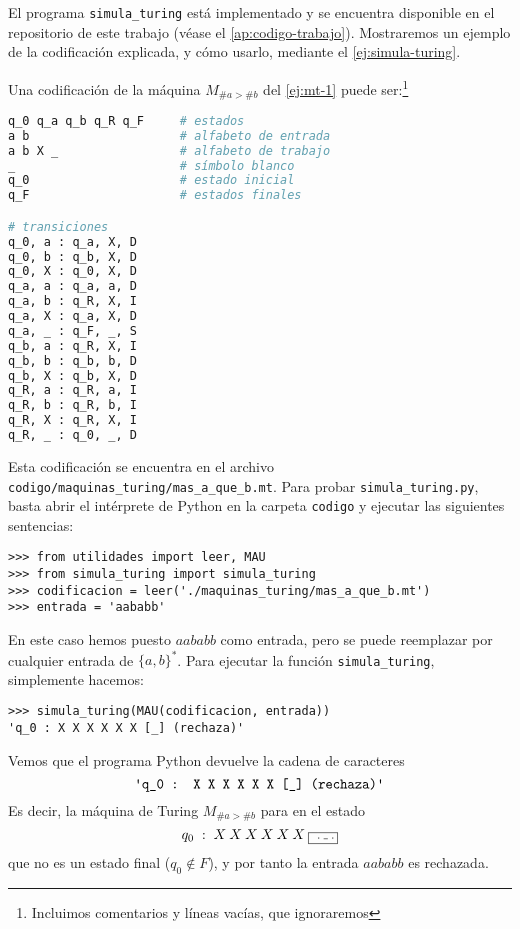 El programa \texttt{simula\_turing} está implementado y se encuentra disponible en el repositorio de este trabajo (véase el \cref{ap:codigo-trabajo}). Mostraremos un ejemplo de la codificación explicada, y cómo usarlo, mediante el \cref{ej:simula-turing}.

\begin{ejemplo}\label{ej:simula-turing}
Una codificación de la máquina $M_{\#a>\#b}$ del \cref{ej:mt-1} puede ser:\footnote{Incluimos comentarios y líneas vacías, que ignoraremos}

\begin{lstlisting}[language=Python]
q_0 q_a q_b q_R q_F     # estados
a b                     # alfabeto de entrada
a b X _                 # alfabeto de trabajo
_                       # símbolo blanco
q_0                     # estado inicial
q_F                     # estados finales

# transiciones
q_0, a : q_a, X, D
q_0, b : q_b, X, D
q_0, X : q_0, X, D
q_a, a : q_a, a, D
q_a, b : q_R, X, I
q_a, X : q_a, X, D
q_a, _ : q_F, _, S
q_b, a : q_R, X, I
q_b, b : q_b, b, D
q_b, X : q_b, X, D
q_R, a : q_R, a, I
q_R, b : q_R, b, I
q_R, X : q_R, X, I
q_R, _ : q_0, _, D
\end{lstlisting}

Esta codificación se encuentra en el archivo \texttt{codigo/maquinas\_turing/mas\_a\_que\_b.mt}. Para probar \texttt{simula\_turing.py}, basta abrir el intérprete de Python en la carpeta \texttt{codigo} y ejecutar las siguientes sentencias:

\begin{lstlisting}[numbers=none,frame=none]
>>> from utilidades import leer, MAU
>>> from simula_turing import simula_turing
>>> codificacion = leer('./maquinas_turing/mas_a_que_b.mt')
>>> entrada = 'aababb'
\end{lstlisting}
En este caso hemos puesto $aababb$ como entrada, pero se puede reemplazar por cualquier entrada de $\{a,b\}^*$. Para ejecutar la función \texttt{simula\_turing}, simplemente hacemos:

\begin{lstlisting}[numbers=none,frame=none]
>>> simula_turing(MAU(codificacion, entrada))
'q_0 : X X X X X X [_] (rechaza)'
\end{lstlisting}
Vemos que el programa Python devuelve la cadena de caracteres $$\texttt{\textquotesingle{}q\_0 : X X X X X X [\_] (rechaza)\textquotesingle}$$Es decir, la máquina de Turing $M_{\#a>\#b}$ para en el estado
$$
    q_0\;:\;X\:X\:X\:X\:X\:X\:\fbox{\Vtextvisiblespace}
$$
que no es un estado final ($q_0 \notin F$), y por tanto la entrada $aababb$ es rechazada.
\end{ejemplo}

